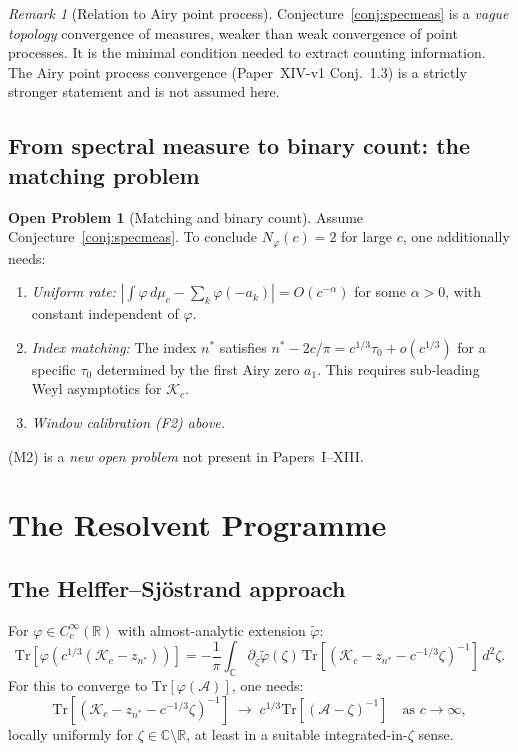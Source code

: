 \documentclass[12pt,a4paper]{amsart}
\theoremstyle{definition}
\newtheorem{problem}[theorem]{Open Problem}
\theoremstyle{remark}
\newtheorem{remark}[theorem]{Remark}
\newcommand{\Kc}{\mathcal{K}_c}
\newcommand{\Tr}{\mathrm{Tr}}
\newcommand{\cA}{\mathcal{A}}
\newcommand{\R}{\mathbb{R}}
\newcommand{\C}{\mathbb{C}}
\begin{document}
\begin{remark}[Relation to Airy point process]
Conjecture~\ref{conj:specmeas} is a \emph{vague topology} convergence
of measures, weaker than weak convergence of point processes.
It is the minimal condition needed to extract counting information.
The Airy point process convergence (Paper~XIV-v1 Conj.\ 1.3)
is a strictly stronger statement and is not assumed here.
\end{remark}

\subsection{From spectral measure to binary count: the matching problem}
\label{sec:matching}

\begin{problem}[Matching and binary count]
\label{prob:matching}
Assume Conjecture~\ref{conj:specmeas}.
To conclude $N_\varphi(c) = 2$ for large $c$, one additionally needs:
\begin{enumerate}[nosep,label=(M\arabic*)]
 \item \emph{Uniform rate:}
 $|\int\varphi\,d\mu_c - \sum_k\varphi(-a_k)| = O(c^{-\alpha})$
 for some $\alpha>0$, with constant independent of $\varphi$.
 \item \emph{Index matching:}
 The index $n^*$ satisfies $n^* - 2c/\pi = c^{1/3}\tau_0 + o(c^{1/3})$
 for a specific $\tau_0$ determined by the first Airy zero $a_1$.
 This requires sub-leading Weyl asymptotics for $\Kc$.
 \item \emph{Window calibration (F2) above.}
\end{enumerate}
(M2) is a \emph{new open problem} not present in Papers~I--XIII.
\end{problem}

\section{The Resolvent Programme}
\label{sec:resolvent}

\subsection{The Helffer--Sj\"ostrand approach}

For $\varphi \in C_c^\infty(\R)$ with almost-analytic extension $\tilde\varphi$:
\begin{equation}\label{eq:HS}
 \Tr[\varphi(c^{1/3}(\Kc - z_{n^*}))]
 = -\frac{1}{\pi}\int_\C \partial_{\bar\zeta}\tilde\varphi(\zeta)\,
 \Tr[(\Kc - z_{n^*} - c^{-1/3}\zeta)^{-1}]\,d^2\zeta.
\end{equation}
For this to converge to $\Tr[\varphi(\cA)]$, one needs:
\begin{equation}\label{eq:traceconv}
 \Tr[(\Kc - z_{n^*} - c^{-1/3}\zeta)^{-1}]
 \;\longrightarrow\;
 c^{1/3}\Tr[(\cA - \zeta)^{-1}]
 \quad \text{as } c\to\infty,
\end{equation}
locally uniformly for $\zeta \in \C\setminus\R$,
at least in a suitable integrated-in-$\zeta$ sense.
\end{document}
